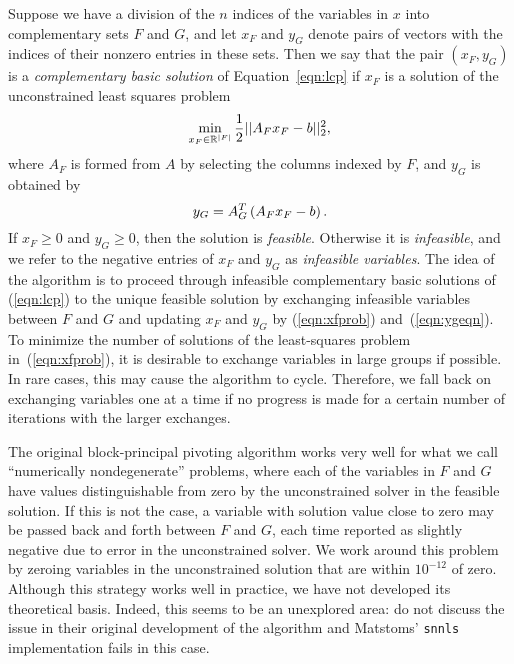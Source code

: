 \documentclass[onecolumn,12pt,tightenlines,amsmath,secnumarabic,%
    floatfix,amssymb,aps,nofootinbib,letterpaper, showkeys]{revtex4}
\def\marginpar#1{}   %
\let\lbl=\label
\def\label#1{\lbl{#1}\ifinner\else\marginpar{\ref{#1} #1}\ignorespaces\fi}
\newcommand{\snnls}{\texttt{snnls} }
\begin{document}
Suppose we have a division of the $n$ indices of the variables in $x$ into complementary sets $F$ and $G$, and let $x_F$ and $y_G$ denote pairs of vectors with the indices of their nonzero entries in these sets. Then we say that the pair $(x_F, y_G)$ is a \emph{complementary basic solution} of Equation~\ref{eqn:lcp} if $x_F$ is a solution of the unconstrained least squares problem
\begin{equation}
\label{eqn:xfprob}
\min_{x_F \in \mathbb{R}^{|F|}} \frac{1}{2} || A_F x_F - b||_2^2,
\end{equation}
where $A_F$ is formed from $A$ by selecting the columns indexed by $F$, and $y_G$ is obtained by
\begin{equation}
\label{eqn:ygeqn}
y_G = A_G^T \left( A_F x_F - b \right).
\end{equation}
If $x_F \geq 0$ and $y_G \geq 0$, then the solution is \emph{feasible}. Otherwise it is
\emph{infeasible}, and we refer to the negative entries of $x_F$ and $y_G$ as \emph{infeasible variables}. The idea of the algorithm is to proceed through infeasible complementary basic solutions of (\ref{eqn:lcp}) to the unique feasible solution by exchanging infeasible variables between $F$ and $G$ and updating $x_F$ and $y_G$ by (\ref{eqn:xfprob}) and~(\ref{eqn:ygeqn}). To minimize the number of solutions of the least-squares problem in~(\ref{eqn:xfprob}), it is desirable to exchange variables in large groups if possible. In rare cases, this may cause the algorithm to cycle. Therefore, we fall back on exchanging variables one at a time if no progress is made for a certain number of iterations with the larger exchanges.

The original block-principal pivoting algorithm works very well for what we call ``numerically nondegenerate'' problems, where each of the variables in $F$ and $G$ have values distinguishable from zero by the unconstrained solver in the feasible solution. If this is not the case, a variable with solution value close to zero may be passed back and forth between $F$ and $G$, each time reported as slightly negative due to error in the unconstrained solver. We work around this problem by zeroing variables in the unconstrained solution that are within $10^{\mathord{-}12}$ of zero. Although this strategy works well in practice, we have not developed its theoretical basis. Indeed, this seems to be an unexplored area: \cite{MR95a:90059} do not discuss the issue in their original development of the algorithm and Matstoms' \snnls implementation fails in this case.
\end{document}
